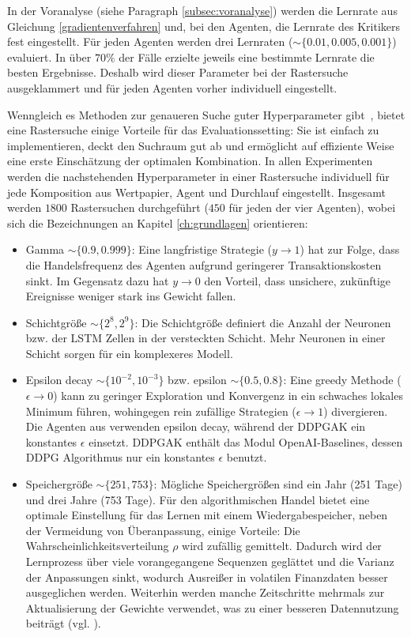 In der Voranalyse (siehe Paragraph \ref{subsec:voranalyse}) werden die Lernrate aus Gleichung \ref{gradientenverfahren} und, bei den  Agenten, die Lernrate des Kritikers fest eingestellt.
Für jeden Agenten werden drei Lernraten ($\sim\{0.01, 0.005,0.001\}$) evaluiert. In über $70\%$ der Fälle erzielte jeweils eine bestimmte Lernrate die besten Ergebnisse. Deshalb wird dieser Parameter bei der Rastersuche ausgeklammert und für jeden Agenten vorher individuell eingestellt.

Wenngleich es Methoden zur genaueren Suche guter Hyperparameter gibt~\parencite{lautenschlager}, bietet eine Rastersuche einige Vorteile für das Evaluationssetting: Sie ist einfach zu implementieren, deckt den Suchraum gut ab und ermöglicht auf effiziente Weise eine erste Einschätzung der optimalen Kombination.
In allen Experimenten werden die nachstehenden Hyperparameter in einer Rastersuche individuell für jede Komposition aus Wertpapier, Agent und Durchlauf eingestellt.
Insgesamt werden $1800$ Rastersuchen durchgeführt ($450$ für jeden der vier Agenten), wobei sich die Bezeichnungen an Kapitel \ref{ch:grundlagen} orientieren:
\begin{itemize}
\item Gamma $\sim\{0.9,0.999\}$:
Eine langfristige Strategie ($y\to1$) hat zur Folge, dass die Handelsfrequenz des Agenten aufgrund geringerer Transaktionskosten sinkt. 
Im Gegensatz dazu hat $y\to0$ den Vorteil, dass unsichere, zukünftige Ereignisse weniger stark ins Gewicht fallen.
\item Schichtgröße $\sim\{2^8,2^9\}$:
Die Schichtgröße definiert die Anzahl der Neuronen bzw. der \acs{LSTM} Zellen in der versteckten Schicht. Mehr Neuronen in einer Schicht sorgen für ein komplexeres Modell.
\item Epsilon decay $\sim\{10^{-2},10^{-3}\}$ bzw. epsilon $\sim\{0.5, 0.8\}$:
Eine greedy Methode ($\epsilon\to0$) kann zu geringer Exploration und Konvergenz in ein schwaches lokales Minimum führen, wohingegen rein zufällige Strategien ($\epsilon\to1$) divergieren. Die Agenten aus \parencite{repo1} verwenden epsilon decay, während der \acs{DDPGAK} ein konstantes $\epsilon$ einsetzt. \acs{DDPGAK} enthält das Modul OpenAI-Baselines, dessen \acs{DDPG} Algorithmus nur ein konstantes $\epsilon$ benutzt.
\item Speichergröße $\sim\{251,753\}$:
Mögliche Speichergrößen sind ein Jahr (251 Tage) und drei Jahre (753 Tage).
Für den algorithmischen Handel bietet eine optimale Einstellung für das Lernen mit einem Wiedergabespeicher, neben der Vermeidung von Überanpassung, einige Vorteile:
Die Wahrscheinlichkeitsverteilung $\rho$ wird zufällig gemittelt. Dadurch wird der Lernprozess über viele vorangegangene Sequenzen geglättet und die Varianz der Anpassungen sinkt, wodurch Ausreißer in volatilen Finanzdaten besser ausgeglichen werden. Weiterhin werden manche Zeitschritte mehrmals zur Aktualisierung der Gewichte verwendet, was zu einer besseren Datennutzung beiträgt (vgl. \parencite{antari}).
\end{itemize}

